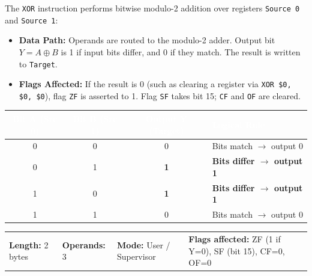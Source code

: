 \documentclass[11pt,a4paper]{article}
\newcommand{\reg}{\$}
\renewcommand{\arraystretch}{1.25}
\begin{document}
\begin{instructiondesc}[title={Detailed Description and Microcode Semantics},top=4pt,bottom=4pt]
The \texttt{XOR} instruction performs bitwise modulo-2 addition over registers \texttt{Source 0} and \texttt{Source 1}:
\begin{itemize}
    \item \textbf{Data Path:} Operands are routed to the modulo-2 adder. Output bit \(Y = A \oplus B\) is 1 if input bits differ, and 0 if they match. The result is written to \texttt{Target}.
    \item \textbf{Flags Affected:} If the result is 0 (such as clearing a register via \texttt{XOR \reg0, \reg0, \reg0}), flag \texttt{ZF} is asserted to 1. Flag \texttt{SF} takes bit 15; \texttt{CF} and \texttt{OF} are cleared.
\end{itemize}
\end{instructiondesc}

\vspace{0.5mm}
\par\vspace{0.8mm}
\noindent
{\footnotesize\renewcommand{\arraystretch}{1.1}%
\begin{tabularx}{\textwidth}{@{} c c c X @{}}
\toprule
\rowcolor{limslate}
\textcolor{white}{\textbf{Bit A (Src 0)}} & \textcolor{white}{\textbf{Bit B (Src 1)}} & \textcolor{white}{\textbf{Output Y (Target)}} & \textcolor{white}{\textbf{Logical Rule}} \\
\midrule
0 & 0 & 0 & Bits match $\rightarrow$ output 0 \\
\rowcolor{limorangelight}
0 & 1 & \textbf{1} & \textbf{Bits differ $\rightarrow$ output 1} \\
\rowcolor{limorangelight}
1 & 0 & \textbf{1} & \textbf{Bits differ $\rightarrow$ output 1} \\
1 & 1 & 0 & Bits match $\rightarrow$ output 0 \\
\bottomrule
\end{tabularx}%
}
\vspace{1mm}

\begin{tcolorbox}[
    enhanced,
    colback=limcard,
    colframe=limborder,
    boxrule=0.6pt,
    arc=3pt,
    left=8pt,right=8pt,top=4pt,bottom=4pt
]
    \footnotesize
    \noindent
    \begin{tabularx}{\textwidth}{@{}l l l X@{}}
        \textbf{Length:} 2 bytes &
        \textbf{Operands:} 3 &
        \textbf{Mode:} User / Supervisor &
        \textbf{Flags affected:} ZF (1 if Y=0), SF (bit 15), CF=0, OF=0
    \end{tabularx}
\end{tcolorbox}
\end{document}
